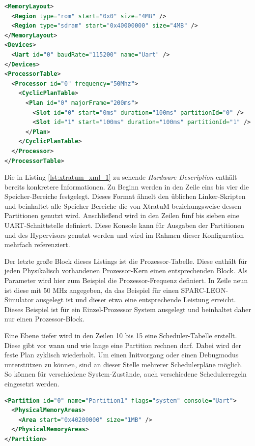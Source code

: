 \documentclass[
  a4paper,					    %
  twoside,
  DIV=calc,     				%
  bibliography=totoc,
  cleardoublepage=empty,
  ngerman,     					%
  final       					%
]{scrbook}
\begin{document}
\begin{lstlisting}[frame=single, language=XML, basicstyle=\footnotesize, caption={XtratuM Hardware Description}, label={lst:xtratum_xml_1}]
<MemoryLayout>
  <Region type="rom" start="0x0" size="4MB" />
  <Region type="sdram" start="0x40000000" size="4MB" />
</MemoryLayout>
<Devices>
  <Uart id="0" baudRate="115200" name="Uart" />
</Devices>
<ProcessorTable>
  <Processor id="0" frequency="50Mhz">
    <CyclicPlanTable>
      <Plan id="0" majorFrame="200ms">
        <Slot id="0" start="0ms" duration="100ms" partitionId="0" />
        <Slot id="1" start="100ms" duration="100ms" partitionId="1" />
      </Plan>
    </CyclicPlanTable>
  </Processor>
</ProcessorTable>
\end{lstlisting}

Die in Listing \ref{lst:xtratum_xml_1} zu sehende \emph{Hardware Description} enthält bereits konkretere Informationen. Zu Beginn werden in den Zeile eins bis vier die Speicher-Bereiche festgelegt. Dieses Format ähnelt den üblichen Linker-Skripten und beinhaltet alle Speicher-Bereiche die von XtratuM beziehungsweise dessen Partitionen genutzt wird. Anschließend wird in den Zeilen fünf bis sieben eine UART-Schnittstelle definiert. Diese Konsole kann für Ausgaben der Partitionen und des Hypervisors genutzt werden und wird im Rahmen dieser Konfiguration mehrfach referenziert.

Der letzte große Block dieses Listings ist die Prozessor-Tabelle. Diese enthält für jeden Physikalisch vorhandenen Prozessor-Kern einen entsprechenden Block. Als Parameter wird hier zum Beispiel die Prozessor-Frequenz definiert. In Zeile neun ist diese mit 50 MHz angegeben, da das Beispiel für einen SPARC-LEON-Simulator ausgelegt ist und dieser etwa eine entsprechende Leistung erreicht. Dieses Beispiel ist für ein Einzel-Prozessor System ausgelegt und beinhaltet daher nur einen Prozessor-Block.

Eine Ebene tiefer wird in den Zeilen 10 bis 15 eine Scheduler-Tabelle erstellt. Diese gibt vor wann und wie lange eine Partition rechnen darf. Dabei wird der feste Plan zyklisch wiederholt. Um einen Initvorgang oder einen Debugmodus unterstützen zu können, sind an dieser Stelle mehrerer Schedulerpläne möglich. So können für verschiedene System-Zustände, auch verschiedene Schedulerregeln eingesetzt werden.

\begin{lstlisting}[frame=single, language=XML, basicstyle=\footnotesize, caption={XtratuM Partition Table}, label={lst:xtratum_xml_2}]
<Partition id="0" name="Partition1" flags="system" console="Uart">
  <PhysicalMemoryAreas>
    <Area start="0x40200000" size="1MB" />
  </PhysicalMemoryAreas>
</Partition>
\end{lstlisting}
\end{document}

